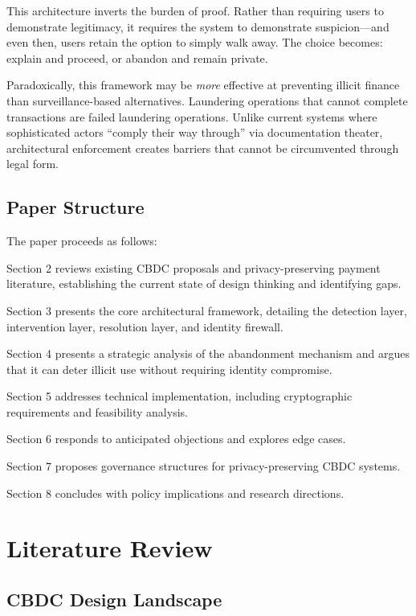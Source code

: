\documentclass[11pt]{article}
\begin{document}
This architecture inverts the burden of proof. Rather than requiring users to demonstrate legitimacy, it requires the system to demonstrate suspicion---and even then, users retain the option to simply walk away. The choice becomes: explain and proceed, or abandon and remain private.

Paradoxically, this framework may be \textit{more} effective at preventing illicit finance than surveillance-based alternatives. Laundering operations that cannot complete transactions are failed laundering operations. Unlike current systems where sophisticated actors ``comply their way through'' via documentation theater, architectural enforcement creates barriers that cannot be circumvented through legal form.

\subsection{Paper Structure}

The paper proceeds as follows:

Section 2 reviews existing CBDC proposals and privacy-preserving payment literature, establishing the current state of design thinking and identifying gaps.

Section 3 presents the core architectural framework, detailing the detection layer, intervention layer, resolution layer, and identity firewall.

Section 4 presents a strategic analysis of the abandonment mechanism and argues that it can deter illicit use without requiring identity compromise.

Section 5 addresses technical implementation, including cryptographic requirements and feasibility analysis.

Section 6 responds to anticipated objections and explores edge cases.

Section 7 proposes governance structures for privacy-preserving CBDC systems.

Section 8 concludes with policy implications and research directions.


\section{Literature Review}

\subsection{CBDC Design Landscape}
\end{document}
